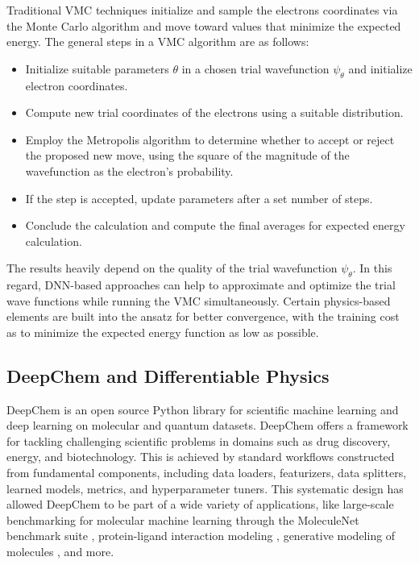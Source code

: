 \documentclass[letterpaper]{article} %
\begin{document}
Traditional VMC techniques initialize and sample the electrons
coordinates via the Monte Carlo algorithm and move toward values that
minimize the expected energy. The general steps in a VMC algorithm are as follows:
\begin{itemize}
    \item Initialize suitable parameters $\theta$ in a chosen trial wavefunction $\psi_\theta$ and initialize electron coordinates.
    \item Compute new trial coordinates of the electrons using a suitable distribution.
    \item Employ the Metropolis algorithm to determine whether to accept or reject the proposed new move, using the square of the magnitude of the wavefunction as the electron's probability.
    \item If the step is accepted, update parameters after a set number of steps.
    \item Conclude the calculation and compute the final averages for expected energy calculation.
\end{itemize}

The results heavily depend on the quality of the trial wavefunction $\psi_\theta$. In this
regard, DNN-based approaches can help to approximate and optimize the trial wave
functions while running the VMC simultaneously. Certain physics-based elements
are built into the ansatz for better convergence, with the training cost as to
minimize the expected energy function as low as possible. \\

\subsection{DeepChem and Differentiable Physics}
DeepChem \cite{ramsundar2021deepchem} is an open source Python library for scientific machine learning and deep learning on molecular and quantum datasets. DeepChem offers a framework for tackling challenging scientific problems in domains such as drug discovery, energy, and biotechnology. This is achieved by standard workflows constructed from fundamental components, including data loaders, featurizers, data splitters, learned models, metrics, and hyperparameter tuners. This systematic design has allowed DeepChem to be part of a wide variety of applications, like large-scale benchmarking for molecular machine learning through the
MoleculeNet benchmark suite \cite{wu2018moleculenet}, protein-ligand interaction modeling \cite{gomes2017atomic}, generative modeling of molecules \cite{frey2023fastflows}, and more.\\
\end{document}
